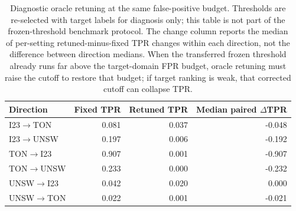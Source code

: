 \begin{table}[htbp]
\centering
\scriptsize
\setlength{\tabcolsep}{4pt}
\caption{Diagnostic oracle retuning at the same \FrozenFprTarget{} false-positive budget. Thresholds are re-selected with target labels for diagnosis only; this table is not part of the frozen-threshold benchmark protocol. The change column reports the median of per-setting retuned-minus-fixed TPR changes within each direction, not the difference between direction medians. When the transferred frozen threshold already runs far above the target-domain \FrozenFprTarget{} FPR budget, oracle retuning must raise the cutoff to restore that budget; if target ranking is weak, that corrected cutoff can collapse TPR.}
\label{tab:oracle-retuned-summary}
\begin{tabular}{lrrr}
\toprule
Direction & Fixed TPR & Retuned TPR & Median paired $\Delta$TPR \\
\midrule
I23$\to$TON & 0.081 & 0.037 & -0.048 \\
I23$\to$UNSW & 0.197 & 0.006 & -0.192 \\
TON$\to$I23 & 0.907 & 0.001 & -0.907 \\
TON$\to$UNSW & 0.233 & 0.000 & -0.232 \\
UNSW$\to$I23 & 0.042 & 0.020 & 0.000 \\
UNSW$\to$TON & 0.022 & 0.001 & -0.021 \\
\bottomrule
\end{tabular}
\end{table}
